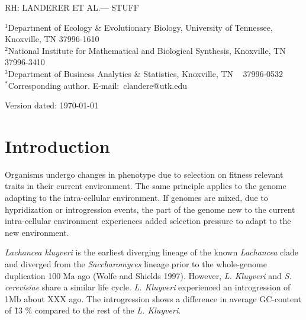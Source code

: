\documentclass[letter,12pt]{article}
\begin{document}
\doublespacing
\linenumbers



\noindent RH: LANDERER ET AL.--- STUFF

\bigskip
\medskip
\begin{center}

\bigskip





\end{center}

\vfill

{\small
\noindent$^{1}$Department of Ecology \& Evolutionary Biology, University of Tennessee, Knoxville, TN 37996-1610\\
\noindent$^{2}$National Institute for Mathematical and Biological Synthesis, Knoxville, TN 37996-3410\\
\noindent$^{3}$Department of Business Analytics \& Statistics, Knoxville, TN ~ 37996-0532 \\
\noindent$^{*}$Corresponding author. E-mail:~clandere@utk.edu
}

\vfill
\centerline{Version dated: \today}
\vfill



\section*{Introduction}

Organisms undergo changes in phenotype due to selection on fitness relevant traits in their current environment. 
The same principle applies to the genome adapting to the intra-cellular environment.
If genomes are mixed, due to hypridization or introgression events, the part of the genome new to the current intra-cellular environment experiences added selection pressure to adapt to the new environment.

\textit{Lachancea kluyveri} is the earliest diverging lineage of the known \textit{Lachancea} clade and diverged from the \textit{Saccharomyces} lineage prior to the whole-genome duplication 100 Ma ago (Wolfe and Shields 1997). 
However, \textit{L. Kluyveri} and \textit{S. cerevisiae} share a similar life cycle.
\textit{L. Kluyveri} experienced an introgression of 1Mb about XXX ago. 
The introgression shows a difference in average GC-content of \~ 13 \% compared to the rest of the \textit{L. Kluyveri}.
\end{document}
